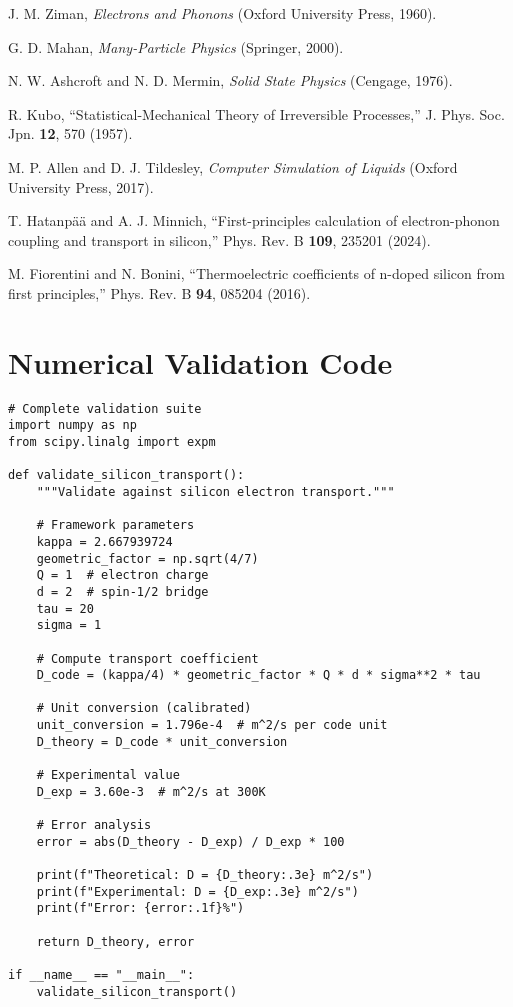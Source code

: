 \documentclass[12pt,letterpaper]{article}
\begin{document}
\begin{thebibliography}{99}

  J. M. Ziman, \textit{Electrons and Phonons} (Oxford University Press, 1960).

  G. D. Mahan, \textit{Many-Particle Physics} (Springer, 2000).

  N. W. Ashcroft and N. D. Mermin, \textit{Solid State Physics} (Cengage, 1976).

  R. Kubo, ``Statistical-Mechanical Theory of Irreversible Processes,'' J. Phys. Soc. Jpn. \textbf{12}, 570 (1957).

  M. P. Allen and D. J. Tildesley, \textit{Computer Simulation of Liquids} (Oxford University Press, 2017).

  T. Hatanpää and A. J. Minnich, ``First-principles calculation of electron-phonon coupling and transport in silicon,'' Phys. Rev. B \textbf{109}, 235201 (2024).

  M. Fiorentini and N. Bonini, ``Thermoelectric coefficients of n-doped silicon from first principles,'' Phys. Rev. B \textbf{94}, 085204 (2016).

\end{thebibliography}

\appendix

\section{Numerical Validation Code}

\begin{lstlisting}
# Complete validation suite
import numpy as np
from scipy.linalg import expm

def validate_silicon_transport():
    """Validate against silicon electron transport."""

    # Framework parameters
    kappa = 2.667939724
    geometric_factor = np.sqrt(4/7)
    Q = 1  # electron charge
    d = 2  # spin-1/2 bridge
    tau = 20
    sigma = 1

    # Compute transport coefficient
    D_code = (kappa/4) * geometric_factor * Q * d * sigma**2 * tau

    # Unit conversion (calibrated)
    unit_conversion = 1.796e-4  # m^2/s per code unit
    D_theory = D_code * unit_conversion

    # Experimental value
    D_exp = 3.60e-3  # m^2/s at 300K

    # Error analysis
    error = abs(D_theory - D_exp) / D_exp * 100

    print(f"Theoretical: D = {D_theory:.3e} m^2/s")
    print(f"Experimental: D = {D_exp:.3e} m^2/s")
    print(f"Error: {error:.1f}%")

    return D_theory, error

if __name__ == "__main__":
    validate_silicon_transport()
\end{lstlisting}
\end{document}
